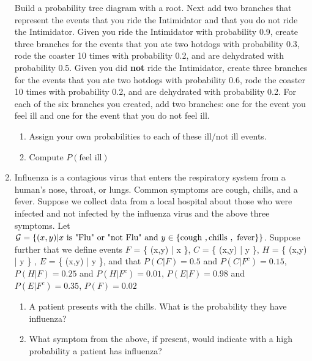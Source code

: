 \begin{enumerate}
   Build a probability tree diagram with a root. Next add two branches that represent the events that you ride the Intimidator and that you do not ride the Intimidator. Given you ride the Intimidator with probability 0.9, create three branches for the events that you ate two hotdogs with probability 0.3, rode the coaster 10 times with probability 0.2, and are dehydrated with probability 0.5. Given you did \textbf{not} ride the Intimidator, create three branches for the events that you ate two hotdogs with probability 0.6, rode the coaster 10 times with probability 0.2, and are dehydrated with probability 0.2. For each of the six branches you created, add two branches: one for the event you feel ill and one for the event that you do not feel ill.
   
   \begin{enumerate}
       \item Assign your own probabilities to each of these ill/not ill events.
       \item Compute $P(\text{feel ill})$
   \end{enumerate}
   
   
   
   
   \item Influenza is a contagious virus that enters the respiratory system from a human's nose, throat, or lungs. Common symptoms are cough, chills, and a fever.
   Suppose we collect data from a local hospital about those who were infected and not infected by the influenza virus and the above three symptoms. Let $\mathcal{G} = \{ (x,y)  | x \text{ is } \text{"Flu"} \text{ or } \text{"not Flu"} \text{ and } y \in \{ \text{cough },\text{chills },\text{ fever} \}   \}$. 
   Suppose further that we define events $F$ = \{ (x,y)  | x   \}, $C$ = \{ (x,y)  | y   \}, $H$ = \{ (x,y)  | y   \} , $E$ = \{ (x,y)  | y   \}, and that $P( C|F ) = 0.5$ and $P( C|F^{c} ) = 0.15$, $P( H|F ) = 0.25$ and $P( H|F^{c} ) = 0.01$, $P( E|F ) = 0.98$ and $P( E|F^{c} ) = 0.35$, $P(F) = 0.02$  
    \begin{enumerate}
       \item A patient presents with the chills. What is the probability they have influenza? 
       \item What symptom from the above, if present, would indicate with a high probability a patient has influenza?
    \end{enumerate}
    
\end{enumerate}

